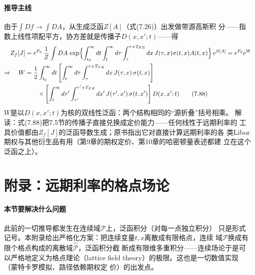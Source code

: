 \paragraph{推导主线}
由于$\int Df\to\int DA$，从生成泛函$Z[A]$（式(7.26)）出发做带源高斯积
分——指数上线性项配平方，协方差就是传播子$D(x,x';t)$——得
\begin{align*}
Z_{f}[J]&=e^{F_{0}}\,\frac{1}{Z}\int DA\,\exp\Bigl\{\int_{t_{0}}^{\infty}dt
\int_{t}^{\infty}d\tau\int_{\tau}^{\tau+T_{FR}}dx\,
J(\tau,x)\sigma(t,x)A(t,x)\Bigr\}\,e^{S[A]}=e^{F_{0}}e^{W}\\
\Rightarrow\quad W&=\frac{1}{2}\int_{t_{0}}^{\infty}dt\,
\Biggl[\int_{t}^{\infty}d\tau\int_{\tau}^{\tau+T_{FR}}dx\,
J(\tau,x)\,\sigma(t,x)\Biggr]\\
&\qquad\times\Biggl[\int_{t}^{\infty}d\tau'\int_{\tau'}^{\tau'+T_{FR}}dx'\,
J(\tau',x')\,\sigma(t,x')\Biggr]\,D(x,x';t)
\tag{7.88}
\end{align*}
$W$是以$D(x,x';t)$为核的双线性泛函：两个结构相同的“源折叠”括号相乘。
解读：式(7.88)把7.5节的传播子直接兑换成定价能力——任何线性于远期利率的
工具价值都由$Z_{f}[J]$的泛函导数生成；原书指出它对直接计算远期利率的各
类Libor期权与其他衍生品有用（第9章的期权定价、第10章的哈密顿量表述都建
立在这个泛函之上）。

\section{附录：远期利率的格点场论}

\paragraph{本节要解决什么问题}
此前的一切推导都发生在连续域$\mathcal{P}$上，泛函积分（对每一点独立积分）
只是形式记号。本附录给出严格化方案：把连续变量$t,x$离散成有限格点，连续
域$\mathcal{P}$换成有限个格点构成的离散域$\hat{\mathcal{P}}$，泛函积分截
断成有限维多重积分——连续场论于是可以严格地定义为格点理论（lattice
field theory）的极限。这也是一切数值实现（蒙特卡罗模拟、路径依赖期权定
价）的出发点。

